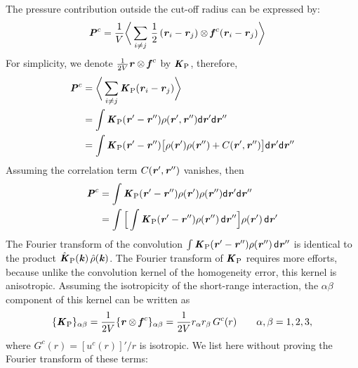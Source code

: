 \documentclass[aps,pre,preprint]{revtex4-1}
\renewcommand{\v}[1]{\textbf{\textit{#1}}}
\renewcommand{\d}[1]{\textsf{#1}}
\begin{document}
The pressure contribution outside the cut-off radius can be expressed
by:
\begin{align}
  \v P^c &= \frac1{V} \bigg\langle \sum_{i\neq j}\,\frac12\, (\v r_i - \v r_j) \otimes \v f^c(\v r_i - \v r_j) \bigg\rangle
\end{align}
For simplicity, we denote $\frac{1}{2V}\v r\otimes\v f^c$ by $\v
K_{\textrm{P}}$, therefore,
\begin{align}\nonumber
  \v P^c
  &= \bigg\langle \sum_{i\neq j} \v K_{\textrm{P}}(\v r_i - \v r_j) \bigg\rangle\\\nonumber
  & = \int \v K_{\textrm{P}}(\v r' - \v r'') \rho(\v r', \v r'') \d d\v r'\d d\v r'' \\\nonumber
  & = \int \v K_{\textrm{P}}(\v r' - \v r'')
  \big[
  \rho(\v r') \rho(\v r'') + C(\v r', \v r'')
  \big]
  \d d\v r'\d d\v r''
\end{align}
Assuming the correlation term $C(\v r', \v r'')$ vanishes, then
\begin{align} \nonumber
  \v P^c
  & = \int \v K_{\textrm{P}}(\v r' - \v r'')
  \rho(\v r') \rho(\v r'') 
  \d d\v r'\d d\v r'' \\
  & = \int
  \Big[
  \int \v K_{\textrm{P}}(\v r' - \v r'') \rho(\v r'')\,\d d\v r''
  \Big]
  \rho(\v r')\,\d d\v r'
\end{align}
The Fourier transform of the convolution $\int \v K_{\textrm{P}}(\v r'
- \v r'') \rho(\v r'')\,\d d\v r''$ is identical to the product $\hat
{\v K}_{\textrm{P}}(\v k)\,\hat \rho(\v k)$. The Fourier transform of
${\v K}_{\textrm{P}}$ requires more efforts, because unlike
the convolution kernel of the homogeneity error, this kernel is 
anisotropic.  Assuming the isotropicity of the short-range interaction,
the $\alpha\beta$ component of this kernel can be written as
\begin{align}
  \{\v K_{\textrm{P}}\}_{\alpha\beta}
  = \frac1{2V}\{\v r\otimes\v f^c\}_{\alpha\beta}
  = \frac1{2V} r_\alpha r_\beta \,G^c(r)
  \qquad \alpha, \beta = 1, 2, 3,
\end{align}
where $G^c(r) = [u^c(r)]'/r$ is isotropic.  We list
here without proving the Fourier transform of these terms:
\end{document}
